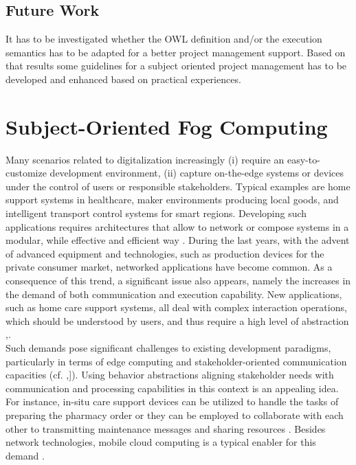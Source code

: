 \subsection{Future Work}
It has to be investigated whether the OWL definition and/or the execution semantics has to be adapted for a better project management support. Based on that results some guidelines for a subject oriented project management has to be developed and enhanced based on practical experiences.


\section{Subject-Oriented Fog Computing}

Many scenarios related to digitalization increasingly (i) require an easy-to-customize development environment, (ii) capture on-the-edge systems or devices under the control of users or responsible stakeholders. Typical examples are home support systems in healthcare, maker environments producing local goods, and intelligent transport control systems for smart regions. Developing such applications requires architectures that allow to network or compose systems in a modular, while effective and efficient way \cite{article:SurveyCompConcepts}. During the last years, with the advent of advanced equipment and technologies, such as production devices for the private consumer market, networked applications have become common. As a consequence of this trend, a significant issue also appears, namely the increases in the demand of both communication and execution capability. New applications, such as home care support systems, all deal with complex interaction operations, which should be understood by users, and thus require a high level of abstraction \cite{article:FogHealthcare},\cite{article:MobilecloudComp}.
\\
Such demands pose significant challenges to existing development paradigms, particularly in terms of edge computing and stakeholder-oriented communication capacities (cf. \cite{article:SurveyCompConcepts},\cite{article:FogHealthcare}]). Using behavior abstractions aligning stakeholder needs with communication and processing capabilities in this context is an appealing idea. For instance, in-situ care support devices can be utilized to handle the tasks of preparing the pharmacy order or they can be employed to collaborate with each other to transmitting maintenance messages and sharing resources \cite{article:FogHealthcare}. Besides network technologies, mobile cloud computing is a typical enabler for this demand \cite{article:MobilecloudComp}.\\
